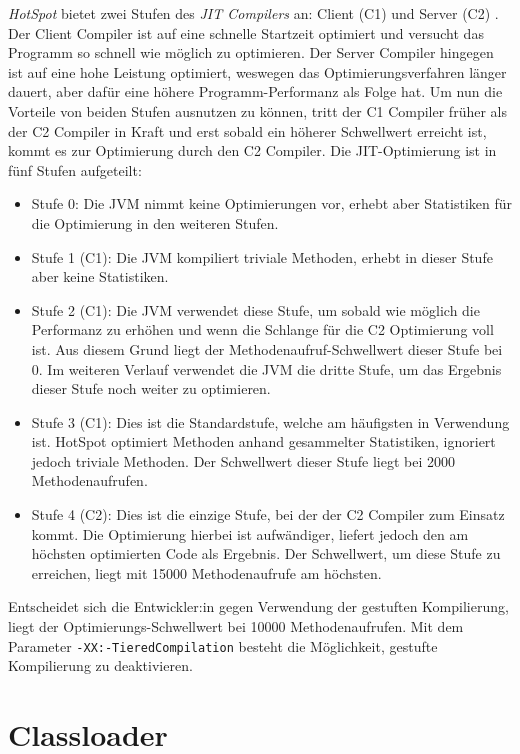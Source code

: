 \textit{HotSpot} bietet zwei Stufen des \textit{JIT Compilers} an: Client (C1) und Server (C2) \parencite{jvmhotspot}. Der Client Compiler ist auf eine schnelle Startzeit optimiert und versucht das Programm so schnell wie möglich zu optimieren. Der Server Compiler hingegen ist auf eine hohe Leistung optimiert, weswegen das Optimierungsverfahren länger dauert, aber dafür eine höhere Programm-Performanz als Folge hat. Um nun die Vorteile von beiden Stufen ausnutzen zu können, tritt der C1 Compiler früher als der C2 Compiler in Kraft und erst sobald ein höherer Schwellwert erreicht ist, kommt es zur Optimierung durch den C2 Compiler. Die JIT-Optimierung ist in fünf Stufen aufgeteilt:
\begin{itemize}
    \item Stufe 0: Die JVM nimmt keine Optimierungen vor, erhebt aber Statistiken für die Optimierung in den weiteren Stufen.
    \item Stufe 1 (C1): Die JVM kompiliert triviale Methoden, erhebt in dieser Stufe aber keine Statistiken.
    \item Stufe 2 (C1): Die JVM verwendet diese Stufe, um sobald wie möglich die Performanz zu erhöhen und wenn die Schlange für die C2 Optimierung voll ist. Aus diesem Grund liegt der Methodenaufruf-Schwellwert dieser Stufe bei 0. Im weiteren Verlauf verwendet die JVM die dritte Stufe, um das Ergebnis dieser Stufe noch weiter zu optimieren.
    \item Stufe 3 (C1): Dies ist die Standardstufe, welche am häufigsten in Verwendung ist. HotSpot optimiert Methoden anhand gesammelter Statistiken, ignoriert jedoch triviale Methoden. Der Schwellwert dieser Stufe liegt bei 2000 Methodenaufrufen.
    \item Stufe 4 (C2): Dies ist die einzige Stufe, bei der der C2 Compiler zum Einsatz kommt. Die Optimierung hierbei ist aufwändiger, liefert jedoch den am höchsten optimierten Code als Ergebnis. Der Schwellwert, um diese Stufe zu erreichen, liegt mit 15000 Methodenaufrufe am höchsten.
\end{itemize}

Entscheidet sich die Entwickler:in gegen Verwendung der gestuften Kompilierung, liegt der Optimierungs-Schwellwert bei 10000 Methodenaufrufen. Mit dem Parameter \texttt{-XX:-TieredCompilation} besteht die Möglichkeit, gestufte Kompilierung zu deaktivieren.

\section{Classloader}

